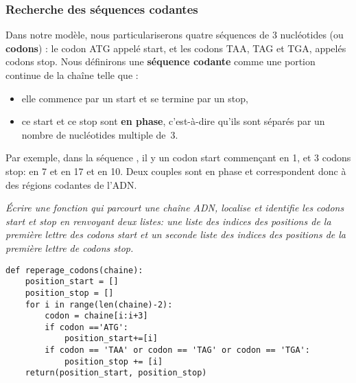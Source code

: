 \subsubsection{Recherche des séquences codantes}
Dans notre modèle, nous particulariserons quatre séquences de 3 nucléotides (ou {\bf codons}) : le codon ATG appelé {\sc start}, et les codons TAA, TAG et TGA, appelés codons {\sc stop}. Nous définirons une {\bf séquence codante} comme une portion continue de la chaîne telle que :
\begin{itemize}
\item elle commence par un {\sc start} et se termine par un {\sc stop},
\item ce {\sc start} et ce {\sc stop} sont {\bf en phase}, c'est-à-dire qu'ils sont séparés par un nombre de nucléotides multiple de~3.
\end{itemize}
Par exemple, dans la séquence , il y un codon {\sc start} commençant en 1, et 3 codons {\sc stop}:  en 7 et en 17 et  en 10. Deux couples sont en phase et correspondent donc à des régions codantes de l'ADN.
\begin{Exercise}\it 
Écrire une fonction  qui parcourt une chaîne ADN, localise et identifie les codons {\sc start} et {\sc stop} en renvoyant deux listes: une liste des indices des positions de la première lettre des codons {\sc start} et un seconde liste des indices des positions de la première lettre de codons {\sc stop}.
\end{Exercise}
\begin{Answer}
\begin{lstlisting}
def reperage_codons(chaine):
    position_start = []
    position_stop = []
    for i in range(len(chaine)-2):
        codon = chaine[i:i+3]
        if codon =='ATG':
            position_start+=[i]
        if codon == 'TAA' or codon == 'TAG' or codon == 'TGA':
            position_stop += [i]     
    return(position_start, position_stop)
\end{lstlisting}
\end{Answer}
